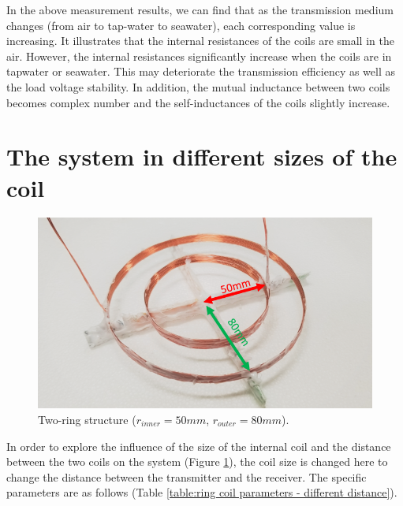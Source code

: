 In the above measurement results, we can find that as the transmission medium changes (from air to tap-water to seawater), each corresponding value is increasing.
It illustrates that the internal resistances of the coils are small in the air.
However, the internal resistances significantly increase when the coils are in tapwater or seawater.
This may deteriorate the transmission efficiency as well as the load voltage stability.
In addition, the mutual inductance between two coils becomes complex number and the self-inductances of the coils slightly increase. 

\section{The system in different sizes of the coil}

\begin{figure}[!t]
    \centering
    \includegraphics[width=0.9\linewidth]{images/3_two_ring_coil_5cm_8cm.png}
    \caption{Two-ring structure ($r_{inner}=50mm$, $r_{outer}=80mm$).}
    \label{fig:3_two_ring_coil_5cm_8cm}
\end{figure}

In order to explore the influence of the size of the internal coil and the distance between the two coils on the system (Figure \ref{fig:3_two_ring_coil_5cm_8cm}), the coil size is changed here to change the distance between the transmitter and the receiver. The specific parameters are as follows (Table \ref{table:ring coil parameters - different distance}).

